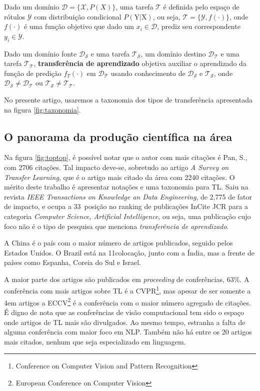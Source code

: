 \documentclass[sigconf]{acmart}
\begin{document}
    Dado um domínio $\mathcal{D}=\{\mathcal{X}, P(X)\}$, uma tarefa $\mathcal{T}$ é definida pelo espaço de rótulos $\mathcal{Y}$ com distribuição condicional $P(\mathrm{Y}|\mathrm{X})$, ou seja, $\mathcal{T}=\{\mathcal{Y}, f(\cdot)\}$, onde $f(\cdot)$ é uma função objetivo que dado um $x_i \in \mathcal{D}$, prediz seu correspondente $y_i \in \mathcal{Y}$. 

    Dado um domínio fonte $\mathcal{D_S}$ e uma tarefa $\mathcal{T_S}$, um domínio destino $\mathcal{D_T}$ e uma tarefa $\mathcal{T_T}$, \textbf{transferência de aprendizado} objetiva auxiliar o aprendizado da função de predição $f_T(\cdot)$ em  $\mathcal{D_T}$ usando conhecimento de $\mathcal{D_S}$ e $\mathcal{T_S}$, onde $\mathcal{D_S}\neq\mathcal{D_T}$ ou $\mathcal{T_S}\neq\mathcal{T_T}$.

    No presente artigo, usaremos a taxonomia dos tipos de transferência apresentada na figura \ref{fig:taxonomia}. 
    \subsection{O panorama da produção científica na área}\label{sec:panorama}
  Na figura \ref{fig:toptop}, é possível notar que o autor com mais citações é Pan, S., com 2706 citações. Tal impacto deve-se, sobretudo ao artigo \emph{A Survey on Transfer Learning}, que é o artigo mais citado da área com 2240 citações. O mérito deste trabalho é apresentar notações e uma taxonomia para TL. Saiu na revista \emph{IEEE Transactions on Knowledge an Data Engineering}, de 2,775 de fator de impacto, e ocupa a 33\textordfeminine ~posição no ranking de publicações InCite JCR para a categoria \emph{Computer Science, Artificial Intelligence}, ou seja, uma publicação cujo foco não é o tipo de pesquisa que menciona \emph{transferência de aprendizado}. 

  A China é o país com o maior número de artigos publicados, seguido pelos Estados Unidos. O Brazil está na 11\textordfeminine colocação, junto com a Índia, mas a frente de países como Espanha, Coreia do Sul e Israel.

  A maior parte dos artigos são publicados em \emph{proceeding} de conferências, 63\%. A conferência com mais artigos sobre TL é a CVPR\footnote{Conference on Computer Vision and Pattern Recognition}, mas apesar de ser somente a 4\textordfeminine em artigos a ECCV\footnote{European Conference on Computer Vision} é a conferência com o maior número agregado de citações. É digno de nota que as conferências de visão computacional tem sido o espaço onde artigos de TL mais são divulgados. Ao mesmo tempo, estranha a falta de alguma conferência com maior foco em NLP. Também não há entre os 20 artigos mais citados, nenhum que seja especializado em linguagem.
\end{document}
